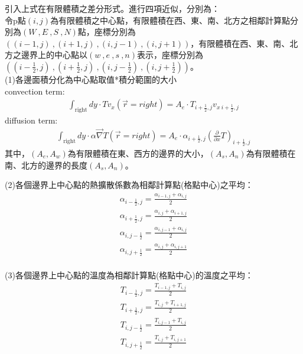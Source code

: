 \documentclass[12pt]{article}
\begin{document}
引入上式在有限體積之差分形式。進行四項近似，分別為：\\
\noindent 令p點$(i,j)$為有限體積之中心點，有限體積在西、東、南、北方之相鄰計算點分別為$(W\ ,E\ ,S\ ,N)$點，座標分別為$((i-1,j)\ ,(i+1,j)\ ,(i,j-1)\ ,(i,j+1))$，有限體積在西、東、南、北方之邊界上的中心點以$(w\ ,e\ ,s\ ,n)$表示，座標分別為$((i-\frac{1}{2},j)\ ,(i+\frac{1}{2},j)\ ,(i,j-\frac{1}{2})\ ,(i,j+\frac{1}{2}))$。\\
(1)各邊面積分化為中心點取值*積分範圍的大小\\
\noindent convection term:
\begin{equation}
\begin{split}
  \int_{\mbox{right}} dy \cdot T v_x(\vec{r} = right) = A_{e} \cdot T_{i+\frac{1}{2},j}v_{x\ i+\frac{1}{2},j}
\end{split}
\end{equation}
\noindent diffusion term:
\begin{equation}
\begin{split}
\int_{\mbox{right}} dy  \cdot  \alpha \vec{\nabla} T(\vec{r} = right) = A_{e} \cdot \alpha_{i+\frac{1}{2},j} (\frac{\partial}{\partial x} T)_{i+\frac{1}{2},j}
\end{split}
\end{equation}
\noindent 其中，$(A_{e},A_{w})$為有限體積在東、西方的邊界的大小，$(A_{s},A_{n})$為有限體積在南、北方的邊界的長度$(A_{s},A_{n})$。\\
\begin{minipage}[t]{0.45\textwidth}
  \raggedright
  (2)各個邊界上中心點的熱擴散係數為相鄰計算點(格點中心)之平均：
\begin{equation}
  \begin{split}
    \alpha_{i-\frac{1}{2},j} = \frac{\alpha_{i-1,j} + \alpha_{i,j}}{2}\\
    \alpha_{i+\frac{1}{2},j} = \frac{\alpha_{i,j} + \alpha_{i+1,j}}{2} \\
    \alpha_{i,j-\frac{1}{2}} = \frac{\alpha_{i,j-1} + \alpha_{i,j}}{2}\\
    \alpha_{i,j+\frac{1}{2}} = \frac{\alpha_{i,j} + \alpha_{i,j+1}}{2}\\
  \end{split}
\end{equation}
\end{minipage}
\hfill
\begin{minipage}[t]{0.45\textwidth}
  \raggedleft
  (3)各個邊界上中心點的溫度為相鄰計算點(格點中心)的溫度之平均：
  \begin{equation}
    \begin{split}
    T_{i-\frac{1}{2},j} = \frac{T_{i-1,j} + T_{i,j}}{2}\\
    T_{i+\frac{1}{2},j} = \frac{T_{i,j} + T_{i+1,j}}{2} \\
    T_{i,j-\frac{1}{2}} = \frac{T_{i,j-1} + T_{i,j}}{2}\\
    T_{i,j+\frac{1}{2}} = \frac{T_{i,j} + T_{i,j+1}}{2}\\
    \end{split}
  \end{equation}
\end{minipage}
\vspace{0.6em}
\end{document}
